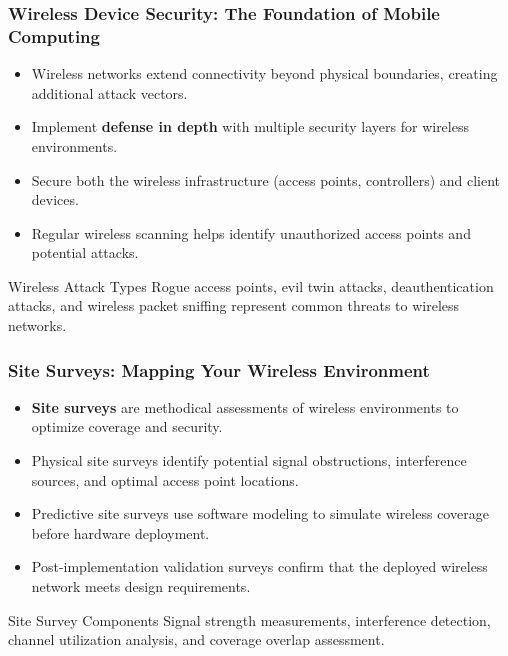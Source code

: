 \documentclass{beamer}
\begin{document}
\begin{frame}
    \frametitle{Wireless Device Security: The Foundation of Mobile Computing}
    
    \begin{itemize}
        \item Wireless networks extend connectivity beyond physical boundaries, creating additional attack vectors.
        \item Implement \textbf{defense in depth} with multiple security layers for wireless environments.
        \item Secure both the wireless infrastructure (access points, controllers) and client devices.
        \item Regular wireless scanning helps identify unauthorized access points and potential attacks.
    \end{itemize}
    
    \begin{exampleblock}{Wireless Attack Types}
        Rogue access points, evil twin attacks, deauthentication attacks, and wireless packet sniffing represent common threats to wireless networks.
    \end{exampleblock}
\end{frame}

\begin{frame}
    \frametitle{Site Surveys: Mapping Your Wireless Environment}
    
    \begin{itemize}
        \item \textbf{Site surveys} are methodical assessments of wireless environments to optimize coverage and security.
        \item Physical site surveys identify potential signal obstructions, interference sources, and optimal access point locations.
        \item Predictive site surveys use software modeling to simulate wireless coverage before hardware deployment.
        \item Post-implementation validation surveys confirm that the deployed wireless network meets design requirements.
    \end{itemize}
    
    \begin{block}{Site Survey Components}
        Signal strength measurements, interference detection, channel utilization analysis, and coverage overlap assessment.
    \end{block}
\end{frame}
\end{document}
